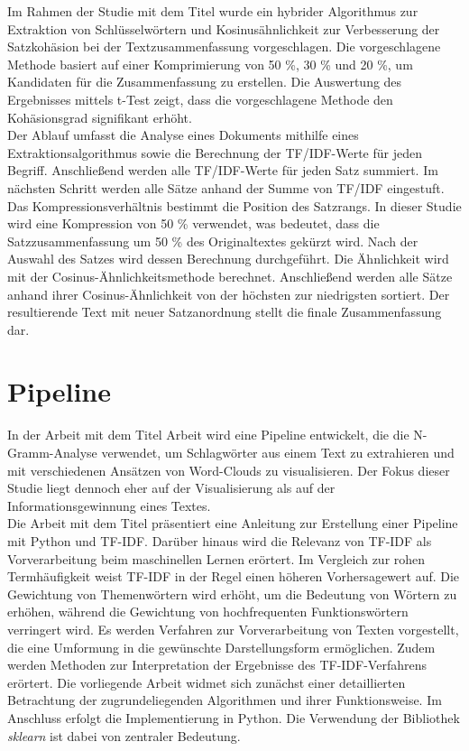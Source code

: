 Im Rahmen der Studie mit dem Titel \cite{darmawan2015hybrid} wurde ein hybrider Algorithmus zur Extraktion von Schlüsselwörtern und Kosinusähnlichkeit zur Verbesserung der Satzkohäsion bei der Textzusammenfassung vorgeschlagen. Die vorgeschlagene Methode basiert auf einer Komprimierung von 50 \%, 30 \% und 20 \%, um Kandidaten für die Zusammenfassung zu erstellen. Die Auswertung des Ergebnisses mittels t-Test zeigt, dass die vorgeschlagene Methode den Kohäsionsgrad signifikant erhöht.\\
Der Ablauf umfasst die Analyse eines Dokuments mithilfe eines Extraktionsalgorithmus sowie die Berechnung der TF/IDF-Werte für jeden Begriff. Anschließend werden alle TF/IDF-Werte für jeden Satz summiert. Im nächsten Schritt werden alle Sätze anhand der Summe von TF/IDF eingestuft. Das Kompressionsverhältnis bestimmt die Position des Satzrangs. In dieser Studie wird eine Kompression von 50 \% verwendet, was bedeutet, dass die Satzzusammenfassung um 50 \% des Originaltextes gekürzt wird. Nach der Auswahl des Satzes wird dessen Berechnung durchgeführt. Die Ähnlichkeit wird mit der Cosinus-Ähnlichkeitsmethode berechnet. Anschließend werden alle Sätze anhand ihrer Cosinus-Ähnlichkeit von der höchsten zur niedrigsten sortiert. Der resultierende Text mit neuer Satzanordnung stellt die finale Zusammenfassung dar.\\

\section{Pipeline}
In der Arbeit mit dem Titel \cite{pirk2019implementierung} Arbeit wird eine Pipeline entwickelt, die die N-Gramm-Analyse verwendet, um Schlagwörter aus einem Text zu extrahieren und mit verschiedenen Ansätzen von Word-Clouds zu visualisieren. Der Fokus dieser Studie liegt dennoch eher auf der Visualisierung als auf der Informationsgewinnung eines Textes.\\

Die Arbeit mit dem Titel \cite{lavin2019analyzing} präsentiert eine Anleitung zur Erstellung einer Pipeline mit Python und TF-IDF. Darüber hinaus wird die Relevanz von TF-IDF als Vorverarbeitung beim maschinellen Lernen erörtert. Im Vergleich zur rohen Termhäufigkeit weist TF-IDF in der Regel einen höheren Vorhersagewert auf. Die Gewichtung von Themenwörtern wird erhöht, um die Bedeutung von Wörtern zu erhöhen, während die Gewichtung von hochfrequenten Funktionswörtern verringert wird. Es werden Verfahren zur Vorverarbeitung von Texten vorgestellt, die eine Umformung in die gewünschte Darstellungsform ermöglichen. Zudem werden Methoden zur Interpretation der Ergebnisse des TF-IDF-Verfahrens erörtert. Die vorliegende Arbeit widmet sich zunächst einer detaillierten Betrachtung der zugrundeliegenden Algorithmen und ihrer Funktionsweise. Im Anschluss erfolgt die Implementierung in Python. Die Verwendung der Bibliothek \emph{sklearn} ist dabei von zentraler Bedeutung.\\

